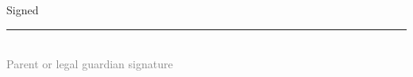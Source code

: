 \documentclass{ross}
\begin{document}
\vspace{0.5in}
\hfill Signed \rule{3in}{0.1mm}\\[-1.5mm]
\hspace*{3.7in} {\footnotesize \textcolor{gray}{Parent or legal guardian signature} }


\vspace{0.5in}



\end{document}
